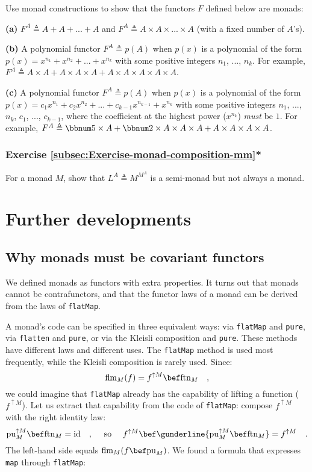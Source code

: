 Use monad constructions to show that the functors $F$ defined below
are monads:

\textbf{(a)} $F^{A}\triangleq A+A+...+A$ and $F^{A}\triangleq A\times A\times...\times A$
(with a fixed number of $A$\textsf{'}s).

\textbf{(b)} A polynomial functor $F^{A}\triangleq p(A)$ when $p(x)$
is a polynomial of the form $p(x)=x^{n_{1}}+x^{n_{2}}+...+x^{n_{k}}$
with some positive integers $n_{1}$, ..., $n_{k}$. For example,
$F^{A}\triangleq A\times A+A\times A\times A+A\times A\times A\times A\times A$. 

\textbf{(c)} A polynomial functor $F^{A}\triangleq p(A)$ when $p(x)$
is a polynomial of the form $p(x)=c_{1}x^{n_{1}}+c_{2}x^{n_{2}}+...+c_{k-1}x^{n_{k-1}}+x^{n_{k}}$
with some positive integers $n_{1}$, ..., $n_{k}$, $c_{1}$, ...,
$c_{k-1}$, where the coefficient at the highest power ($x^{n_{k}}$)
\emph{must} be $1$. For example, $F^{A}\triangleq\bbnum 5\times A+\bbnum 2\times A\times A\times A+A\times A\times A\times A$.

\subsubsection{Exercise \label{subsec:Exercise-monad-composition-mm}\ref{subsec:Exercise-monad-composition-mm}{*}}

For a monad $M$, show that $L^{A}\triangleq M^{M^{A}}$ is a semi-monad
but not always a monad.

\section{Further developments}

\subsection{Why monads must be covariant functors}

We defined monads as functors with extra properties. It turns out
that monads cannot be contrafunctors, and that the functor laws of
a monad can be derived from the laws of \lstinline!flatMap!.

A monad\textsf{'}s code can be specified in three equivalent ways: via \lstinline!flatMap!
and \lstinline!pure!, via \lstinline!flatten! and \lstinline!pure!,
or via the Kleisli composition and \lstinline!pure!. These methods
have different laws and different uses. The \lstinline!flatMap! method
is used most frequently, while the Kleisli composition is rarely used.
Since:
\[
\text{flm}_{M}(f)=f^{\uparrow M}\bef\text{ftn}_{M}\quad,
\]
we could imagine that \lstinline!flatMap! already has the capability
of lifting a function ($f^{\uparrow M}$). Let us extract that capability
from the code of \lstinline!flatMap!: compose $f^{\uparrow M}$ with
the right identity law:
\[
\text{pu}_{M}^{\uparrow M}\bef\text{ftn}_{M}=\text{id}\quad,\quad\text{ so }\quad f^{\uparrow M}\bef\gunderline{\text{pu}_{M}^{\uparrow M}\bef\text{ftn}_{M}}=f^{\uparrow M}\quad.
\]
The left-hand side equals $\text{flm}_{M}(f\bef\text{pu}_{M})$. We
found a formula that expresses \lstinline!map! through \lstinline!flatMap!:

